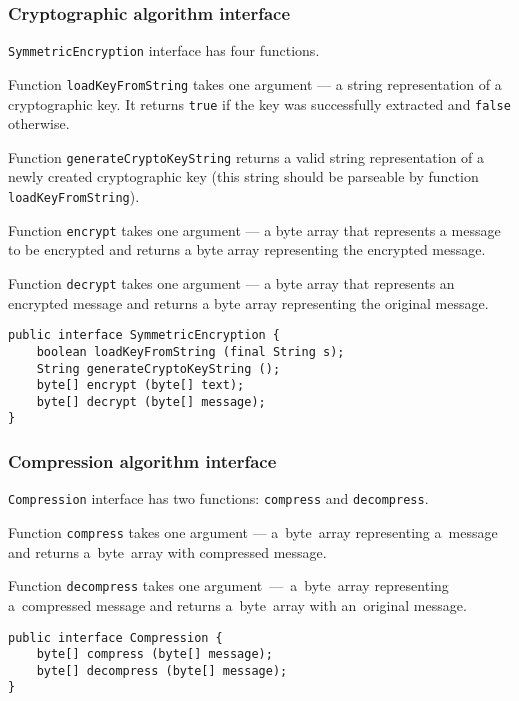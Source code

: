 \subsubsection{Cryptographic algorithm interface}
\texttt{SymmetricEncryption} interface has four functions.

Function \texttt{loadKeyFromString} takes one argument --- 
a string representation of a cryptographic key. It returns
\texttt{true} if the key was successfully extracted and
\texttt{false} otherwise.

Function \texttt{generateCryptoKeyString} returns a 
valid string representation of a newly created cryptographic key 
(this string should be parseable by function \texttt{loadKeyFromString}).

Function \texttt{encrypt} takes one argument --- a byte array that represents
a message to be encrypted and returns a byte array representing the encrypted
message.

Function \texttt{decrypt} takes one argument --- a byte array that represents
an encrypted message and returns a byte array representing the original message.
\pagebreak
\begin{lstlisting}
public interface SymmetricEncryption {
    boolean loadKeyFromString (final String s);
    String generateCryptoKeyString ();
    byte[] encrypt (byte[] text);
    byte[] decrypt (byte[] message);
}
\end{lstlisting}

\subsubsection{Compression algorithm interface}

\texttt{Compression} interface has two functions:
\texttt{compress} and \texttt{decompress}. 

Function \texttt{compress}
takes one argument --- a~byte~array representing a~message and returns
a~byte~array with compressed message. 

Function \texttt{decompress}
takes one argument~---~a~byte~array representing a~compressed message
and returns a~byte~array with an~original message.

\begin{lstlisting} 
public interface Compression {
    byte[] compress (byte[] message);
    byte[] decompress (byte[] message);
}
\end{lstlisting}
